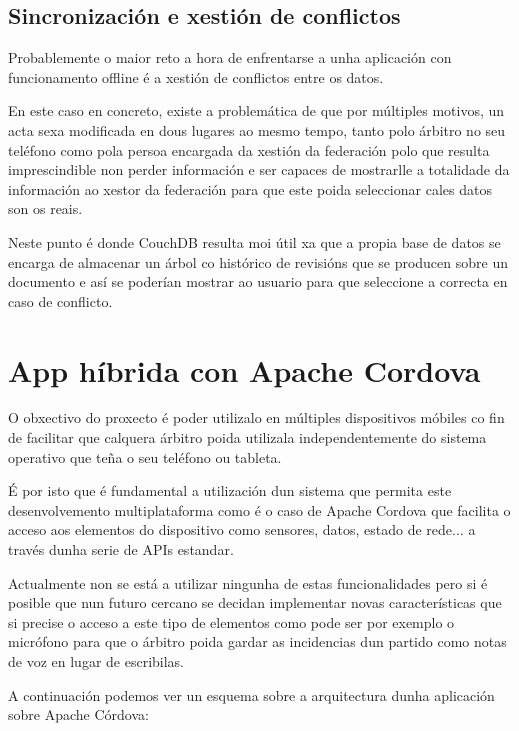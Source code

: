     \subsection{Sincronización e xestión de conflictos}
    Probablemente o maior reto a hora de enfrentarse a unha aplicación con 
funcionamento offline é a xestión de conflictos entre os datos.

    En este caso en concreto, existe a problemática de que por múltiples 
motivos, un acta sexa modificada en dous lugares ao mesmo tempo, tanto polo 
árbitro no seu teléfono como pola persoa encargada da xestión da federación 
polo que resulta imprescindible non perder información e ser capaces de 
mostrarlle a totalidade da información ao xestor da federación para que este 
poida seleccionar cales datos son os reais.

    Neste punto é donde CouchDB resulta moi útil xa que a propia base de datos 
se encarga de almacenar un árbol co histórico de revisións que se producen 
sobre un documento e así se poderían mostrar ao usuario para que seleccione a 
correcta en caso de conflicto.

  \section{App híbrida con Apache Cordova}
  O obxectivo do proxecto é poder utilizalo en múltiples dispositivos móbiles 
co fin de facilitar que calquera árbitro poida utilizala independentemente do 
sistema operativo que teña o seu teléfono ou tableta.

  É por isto que é fundamental a utilización dun sistema que permita este 
desenvolvemento multiplataforma como é o caso de Apache Cordova que facilita o 
acceso aos elementos do dispositivo como sensores, datos, estado de rede... a 
través dunha serie de APIs estandar.

  Actualmente non se está a utilizar ningunha de estas funcionalidades pero si 
é posible que nun futuro cercano se decidan implementar novas características 
que si precise o acceso a este tipo de elementos como pode ser por exemplo o 
micrófono para que o árbitro poida gardar as incidencias dun partido como notas 
de voz en lugar de escribilas.

  A continuación podemos ver un esquema sobre a arquitectura dunha aplicación 
sobre Apache Córdova:

